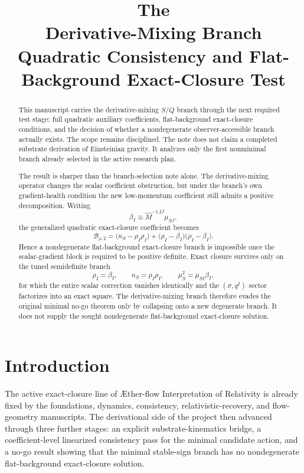 \documentclass[11pt]{article}
\title{\textbf{The \TheoryName{}}\\[0.4em]
\large Derivative-Mixing Branch Quadratic Consistency and Flat-Background Exact-Closure Test}
\author{}
\date{}
\newcommand{\Aflow}{\AE{}ther-flow}
\newcommand{\TheoryName}{\Aflow{} Interpretation of Relativity}
\begin{document}
\maketitle

\begin{abstract}
This manuscript carries the derivative-mixing \(S/Q\) branch through the next required test stage: full quadratic auxiliary coefficients, flat-background exact-closure conditions, and the decision of whether a nondegenerate observer-accessible branch actually exists. The scope remains disciplined. The note does not claim a completed substrate derivation of Einsteinian gravity. It analyzes only the first nonminimal branch already selected in the active research plan.

The result is sharper than the branch-selection note alone. The derivative-mixing operator changes the scalar coefficient obstruction, but under the branch's own gradient-health condition the new low-momentum coefficient still admits a positive decomposition. Writing
\[
\beta_I\equiv \widehat M^{-1\,IJ}\mu_{SJ},
\]
the generalized quadratic exact-closure coefficient becomes
\[
\mathcal B_{\rho,2}
=
\bigl(\kappa_S-\rho_I\rho_I\bigr)
+
\bigl(\rho_I-\beta_I\bigr)\bigl(\rho_I-\beta_I\bigr).
\]
Hence a nondegenerate flat-background exact-closure branch is impossible once the scalar-gradient block is required to be positive definite. Exact closure survives only on the tuned semidefinite branch
\[
\rho_I=\beta_I,
\qquad
\kappa_S=\rho_I\rho_I,
\qquad
\mu_S^2=\mu_{SI}\beta_I,
\]
for which the entire scalar correction vanishes identically and the \((\sigma,q^I)\) sector factorizes into an exact square. The derivative-mixing branch therefore evades the original minimal no-go theorem only by collapsing onto a new degenerate branch. It does not supply the sought nondegenerate flat-background exact-closure solution.
\end{abstract}

\section{Introduction}

The active exact-closure line of \TheoryName{} is already fixed by the foundations, dynamics, consistency, relativistic-recovery, and flow-geometry manuscripts. The derivational side of the project then advanced through three further stages: an explicit substrate-kinematics bridge, a coefficient-level linearized consistency pass for the minimal candidate action, and a no-go result showing that the minimal stable-sign branch has no nondegenerate flat-background exact-closure solution.
\end{document}
